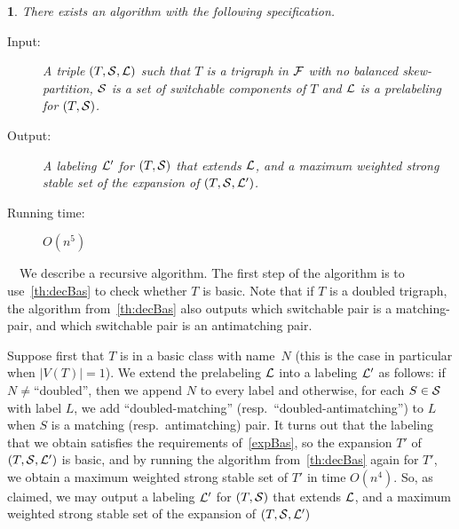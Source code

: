 \documentclass[11 pt] {article}
\newtheorem{theorem}{}[section]
\newcounter{claim}
\newcommand{\Proof}{\setcounter{claim}{0}\noindent{\bf Proof.}\ \ }
\begin{document}
\begin{theorem}
  \label{mainAlg}
  There exists an algorithm with the following specification.
  \begin{description}
  \item[Input:] A triple $(T, {\cal S}, {\cal L})$ such that $T$ is a
    trigraph in $\cal F$ with no balanced skew-partition, $\cal S$ is
    a set of switchable components of $T$ and $\cal L$ is a
    prelabeling for $(T, {\cal S})$.
  \item[Output:] A labeling ${\cal L}'$ for $(T, {\cal S})$ that
    extends $\cal L$, and a maximum weighted strong stable set of the
    expansion of $(T, {\cal S}, {\cal L}')$.
    \item[Running time:] $O(n^5)$ 
  \end{description}
\end{theorem}

\Proof We describe a recursive algorithm.  The first step of the
algorithm is to use~\ref{th:decBas} to check whether $T$ is basic.
Note that if $T$ is a doubled trigraph, the algorithm
from~\ref{th:decBas} also outputs which switchable pair is a
matching-pair, and which switchable pair is an antimatching pair.

Suppose first that $T$ is in a basic class with name~$N$ (this is the
case in particular when $|V(T)| = 1$).  We extend the prelabeling
$\cal L$ into a labeling $\cal L'$ as follows: if $N\neq$``doubled'',
then we append $N$ to every label and otherwise, for each $S\in {\cal
  S}$ with label $L$, we add ``doubled-matching'' (resp.\
``doubled-antimatching'') to $L$ when $S$ is a matching (resp.\
antimatching) pair.  It turns out that the labeling that we obtain
satisfies the requirements of~\ref{expBas}, so the expansion $T'$ of
$(T, {\cal S}, {\cal L'})$ is basic, and by running the algorithm
from~\ref{th:decBas} again for $T'$, we obtain a maximum weighted
strong stable set of $T'$ in time $O(n^4)$.  So, as claimed, we may
output a labeling ${\cal L}'$ for $(T, {\cal S})$ that extends $\cal
L$, and a maximum weighted strong stable set of the expansion of $(T,
{\cal S}, {\cal L}')$
\end{document}
